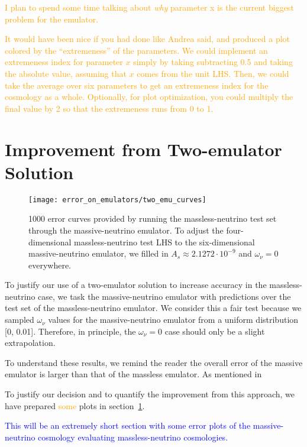 \textcolor{orange}{I plan to spend some time talking 
about \textit{why} parameter x is the current biggest problem for the 
emulator.}

\textcolor{orange}{It would have been nice if you had done like Andrea said,
and produced a plot colored by the ``extremeness'' of the parameters. We
could implement an extremeness index for parameter $x$ simply by taking
subtracting 0.5 and taking the absolute value, assuming that $x$ comes from
the unit LHS. Then, we could take the average over six parameters to get
an extremeness index for the cosmology as a whole. Optionally, for plot
optimization, you could multiply the final value by 2 so that the extremeness
runs from 0 to 1.}


\section{Improvement from Two-emulator Solution}
\label{sec: 2emu_improvement}

\begin{figure}[ht!]
  \centering
  \texttt{[image: error\_on\_emulators/two\_emu\_curves]}
  \caption[Performance of Massive Emulator in Massless Case]{1000 error
  	curves provided
  	by running the massless-neutrino test set through the massive-neutrino 
  	emulator. To adjust the four-dimensional massless-neutrino test LHS to
  	the six-dimensional massive-neutrino emulator, we filled in
  	$A_s \approx 2.1272 \cdot 10^{-9}$ and $\omega_\nu = 0$ everywhere.}
  \label{fig: two_emu_curves}
\end{figure}

To justify our use of a two-emulator solution to increase
accuracy in the massless-neutrino case, we task the massive-neutrino emulator with
predictions over the test set of the massless-neutrino emulator. We consider
this a fair test because we sampled $\omega_\nu$ values for the
massive-neutrino emulator from a uniform distribution [0, 0.01]. Therefore,
in principle, the $\omega_\nu = 0$ case should only be a slight extrapolation.

To understand these results, we remind the reader the overall error of the
massive emulator is larger than that of the massless emulator. As mentioned
in 

To justify our decision and to quantify the improvement from this approach, we
have prepared \textcolor{orange}{some} plots in
section~\ref{sec: 2emu_improvement}.

\textcolor{blue}{This will be an extremely short section with some error
plots of the massive-neutrino cosmology evaluating massless-neutrino
cosmologies.}

